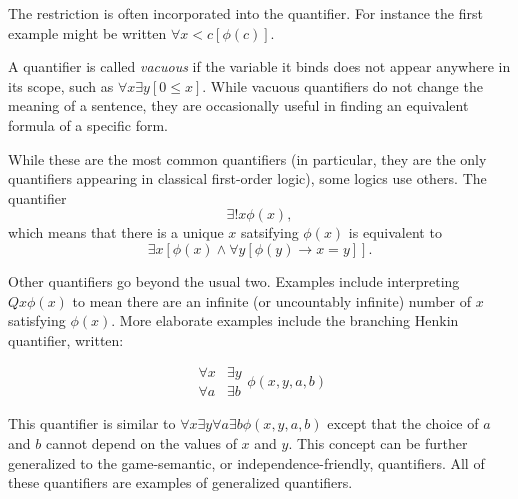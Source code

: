 \documentclass[12pt]{article}
\begin{document}
The restriction is often incorporated into the quantifier.  For instance the first example might be written $\forall x<c[\phi(c)]$.

A quantifier is called \emph{vacuous} if the variable it binds does not appear anywhere in its scope, such as $\forall x\exists y[0\leq x]$.  While vacuous quantifiers do not change the meaning of a sentence, they are occasionally useful in finding an equivalent formula of a specific form.

While these are the most common quantifiers (in particular, they are the only quantifiers appearing in classical first-order logic), some logics use others.  The quantifier $$\exists! x\phi(x),$$ which means that there is a unique $x$ satsifying $\phi(x)$ is equivalent to $$\exists x[\phi(x)\wedge\forall y[\phi(y)\rightarrow x=y]].$$

Other quantifiers go beyond the usual two.  Examples include interpreting $Q x\phi(x)$ to mean there are an infinite (or uncountably infinite) number of $x$ satisfying $\phi(x)$.  More elaborate examples include the branching Henkin quantifier, written:

$$\begin{array}{cc}\forall x&\exists y\\\forall a&\exists b\end{array}\phi(x,y,a,b)$$

This quantifier is similar to $\forall x\exists y\forall a\exists b\phi(x,y,a,b)$ except that the choice of $a$ and $b$ cannot depend on the values of $x$ and $y$.  This concept can be further generalized to the game-semantic, or independence-friendly, quantifiers.  All of these quantifiers are examples of generalized quantifiers.
\end{document}
